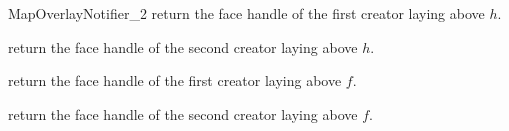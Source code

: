 \begin{ccRefConcept}{MapOverlayNotifier_2}
{return the face handle of the first creator laying above $h$.}

{return the face handle of the second creator laying above $h$.}

{return the face handle of the first creator laying above $f$.}

{return the face handle of the second creator laying above $f$.}

\end{ccRefConcept} %

\ccRefPageEnd
